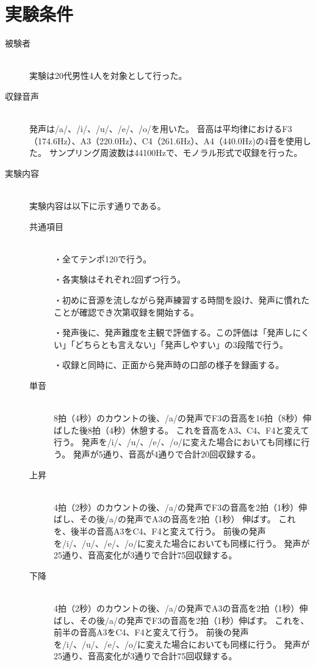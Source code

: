 \documentclass[10.5ptj,a4j,dvipdfmx,uplatex, oneside, openany, report]{jsbook}%
\begin{document}
\section{実験条件}
\begin{description}
    \item[被験者]\mbox{}\\
        実験は20代男性4人を対象として行った。
    \item[収録音声]\mbox{}\\
        発声は/a/、/i/、/u/、/e/、/o/を用いた。
        音高は平均律におけるF3（174.6Hz）、A3（220.0Hz）、C4（261.6Hz）、A4（440.0Hz)の4音を使用した。
        サンプリング周波数は44100Hzで、モノラル形式で収録を行った。
    \item[実験内容]\mbox{}\\
        実験内容は以下に示す通りである。
        \begin{description}
            \item[共通項目]\mbox{}\\
                ・全てテンポ120で行う。
                
                ・各実験はそれぞれ2回ずつ行う。
                
                ・初めに音源を流しながら発声練習する時間を設け、発声に慣れたことが確認でき次第収録を開始する。

                ・発声後に、発声難度を主観で評価する。この評価は「発声しにくい」「どちらとも言えない」「発声しやすい」の3段階で行う。
                
                ・収録と同時に、正面から発声時の口部の様子を録画する。
            \item[単音]\mbox{}\\
                8拍（4秒）のカウントの後、/a/の発声でF3の音高を16拍（8秒）伸ばした後8拍（4秒）休憩する。
                これを音高をA3、C4、F4と変えて行う。
                発声を/i/、/u/、/e/、/o/に変えた場合においても同様に行う。
                発声が5通り、音高が4通りで合計20回収録する。
            \item[上昇]\mbox{}\\
                4拍（2秒）のカウントの後、/a/の発声でF3の音高を2拍（1秒）伸ばし、その後/a/の発声でA3の音高を2拍（1秒）
                伸ばす。
                これを、後半の音高A3をC4、F4と変えて行う。
                前後の発声を/i/、/u/、/e/、/o/に変えた場合においても同様に行う。
                発声が25通り、音高変化が3通りで合計75回収録する。
            \item[下降]\mbox{}\\
                4拍（2秒）のカウントの後、/a/の発声でA3の音高を2拍（1秒）伸ばし、その後/a/の発声でF3の音高を2拍（1秒）伸ばす。
                これを、前半の音高A3をC4、F4と変えて行う。
                前後の発声を/i/、/u/、/e/、/o/に変えた場合においても同様に行う。
                発声が25通り、音高変化が3通りで合計75回収録する。
        \end{description}


\end{description}
\end{document}
